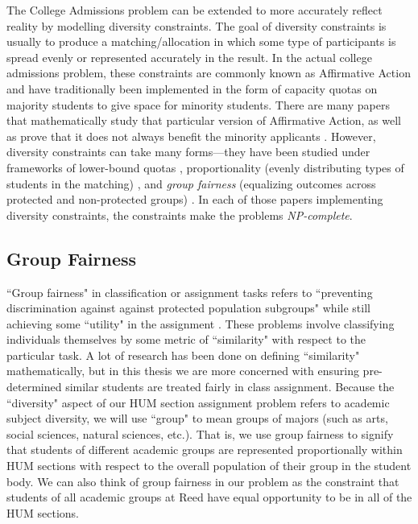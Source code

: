 The College Admissions problem can be extended to more accurately
reflect reality by modelling diversity constraints. The goal of diversity
constraints is usually to produce a matching/allocation in which some type of
participants is spread evenly or represented accurately in the result. In the
actual college admissions problem, these constraints are commonly known as
Affirmative Action and have traditionally been implemented in the form of
capacity quotas on majority students to give space for minority students. There
are many papers that mathematically
study that particular version of Affirmative Action, as well as prove that it does
not always benefit the minority applicants \cite{affirmative-action}. However,
diversity constraints can take many forms—they have been studied under
frameworks of lower-bound quotas \cite{quotas}, proportionality (evenly
distributing types of students in the matching) \cite{proportionality}, and
\textit{group fairness} (equalizing outcomes across protected and non-protected
groups) \cite{fairness}. In each of those papers implementing diversity
constraints, the constraints make the problems \textit{NP-complete}.

\subsection{Group Fairness}

``Group fairness" in classification or assignment tasks refers to
``preventing discrimination against against protected population subgroups"
while still achieving some ``utility" in the assignment \cite{fairness}. These problems
involve classifying individuals themselves by some metric of ``similarity" with
respect to the particular task. A lot of research has been done on defining
``similarity" mathematically, but in this thesis we are more concerned with
ensuring pre-determined similar students are treated fairly in class assignment.
Because the ``diversity" aspect of our HUM section assignment problem refers to academic
subject diversity, we will use ``group" to mean groups of majors (such as arts,
social sciences, natural sciences, etc.). That is, we use group fairness to
signify that students of different academic groups are represented proportionally within
HUM sections with respect to the overall population  of their group in the student
body. We can also think of group fairness in our problem as the constraint that students of
all academic groups at Reed have equal opportunity to be in all of the HUM sections.

